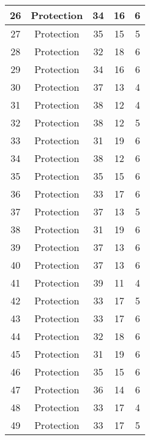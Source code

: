 \documentclass[results.tex]{subfiles}
\begin{document}
\begin{center}
\begin{tabular}{| c || c | c | c | c |}
    \hline
    26 & Protection & 34 & 16 & 6 \\ 
    \hline
    27 & Protection & 35 & 15 & 5 \\ 
    \hline
    28 & Protection & 32 & 18 & 6 \\ 
    \hline
    29 & Protection & 34 & 16 & 6 \\ 
    \hline
    30 & Protection & 37 & 13 & 4 \\ 
    \hline
    31 & Protection & 38 & 12 & 4 \\ 
    \hline
    32 & Protection & 38 & 12 & 5 \\ 
    \hline
    33 & Protection & 31 & 19 & 6 \\ 
    \hline
    34 & Protection & 38 & 12 & 6 \\ 
    \hline
    35 & Protection & 35 & 15 & 6 \\ 
    \hline
    36 & Protection & 33 & 17 & 6 \\ 
    \hline
    37 & Protection & 37 & 13 & 5 \\ 
    \hline
    38 & Protection & 31 & 19 & 6 \\ 
    \hline
    39 & Protection & 37 & 13 & 6 \\ 
    \hline
    40 & Protection & 37 & 13 & 6 \\ 
    \hline
    41 & Protection & 39 & 11 & 4 \\ 
    \hline
    42 & Protection & 33 & 17 & 5 \\ 
    \hline
    43 & Protection & 33 & 17 & 6 \\ 
    \hline
    44 & Protection & 32 & 18 & 6 \\ 
    \hline
    45 & Protection & 31 & 19 & 6 \\ 
    \hline
    46 & Protection & 35 & 15 & 6 \\ 
    \hline
    47 & Protection & 36 & 14 & 6 \\ 
    \hline
    48 & Protection & 33 & 17 & 4 \\ 
    \hline
    49 & Protection & 33 & 17 & 5 \\ 
    \hline   \end{tabular}
\end{center}
\end{document}
